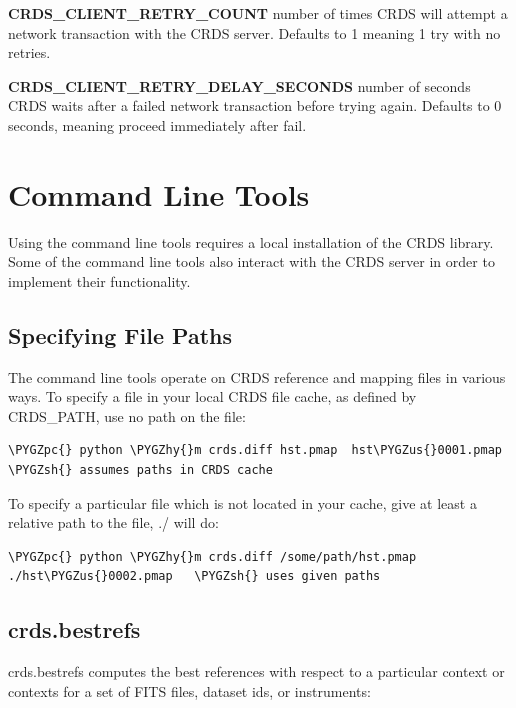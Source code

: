 \documentclass[letterpaper,10pt,english]{sphinxmanual}
\def\PYGZus{\char`\_}
\def\PYGZsh{\char`\#}
\def\PYGZpc{\char`\%}
\def\PYGZhy{\char`\-}
\begin{document}
\textbf{CRDS\_CLIENT\_RETRY\_COUNT} number of times CRDS will attempt a network
transaction with the CRDS server.  Defaults to 1 meaning 1 try with no retries.

\textbf{CRDS\_CLIENT\_RETRY\_DELAY\_SECONDS} number of seconds CRDS waits after a failed
network transaction before trying again.  Defaults to 0 seconds,  meaning
proceed immediately after fail.


\chapter{Command Line Tools}
\label{command_line_tools:command-line-tools}\label{command_line_tools::doc}
Using the command line tools requires a local installation of the CRDS library.
Some of the command line tools also interact with the CRDS server in order to
implement their functionality.


\section{Specifying File Paths}
\label{command_line_tools:specifying-file-paths}
The command line tools operate on CRDS reference and mapping files in various
ways.  To specify a file in your local CRDS file cache,  as defined by CRDS\_PATH,
use no path on the file:

\begin{Verbatim}[commandchars=\\\{\}]
\PYGZpc{} python \PYGZhy{}m crds.diff hst.pmap  hst\PYGZus{}0001.pmap  \PYGZsh{} assumes paths in CRDS cache
\end{Verbatim}

To specify a particular file which is not located in your cache,  give at least
a relative path to the file, ./ will do:

\begin{Verbatim}[commandchars=\\\{\}]
\PYGZpc{} python \PYGZhy{}m crds.diff /some/path/hst.pmap ./hst\PYGZus{}0002.pmap   \PYGZsh{} uses given paths
\end{Verbatim}


\section{crds.bestrefs}
\label{command_line_tools:crds-bestrefs}
crds.bestrefs computes the best references with respect to a particular context or contexts
for a set of FITS files, dataset ids,  or instruments:
\end{document}
